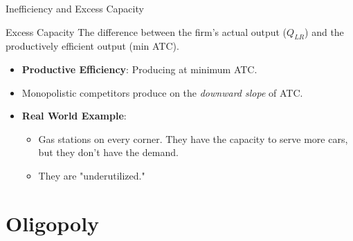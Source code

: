 \documentclass[aspectratio=169]{beamer}
\begin{document}
\begin{frame}{Inefficiency and Excess Capacity}
    \begin{block}{Excess Capacity}
        The difference between the firm's actual output ($Q_{LR}$) and the productively efficient output (min ATC).
    \end{block}
    
    \begin{itemize}
        \item \textbf{Productive Efficiency}: Producing at minimum ATC.
        \item Monopolistic competitors produce on the \textit{downward slope} of ATC.
        \item \textbf{Real World Example}: 
        \begin{itemize}
            \item Gas stations on every corner. They have the capacity to serve more cars, but they don't have the demand.
            \item They are "underutilized."
        \end{itemize}
    \end{itemize}
\end{frame}

\section{Oligopoly}
\end{document}
